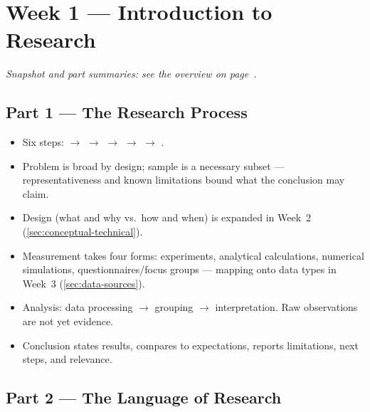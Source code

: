 \documentclass[../main.tex]{subfiles}
\begin{document}
\setlength{\parskip}{3pt}

\chapter{Week 1 — Introduction to Research}
\label{ch:week1}

\textit{Snapshot and part summaries: see the overview on page~\pageref{ov:week1}.}

\section{Part 1 — The Research Process}
\label{sec:research-process}

\begin{itemize}
  \item Six steps:  $\to$  $\to$  $\to$  $\to$  $\to$ .
  \item Problem is broad by design; sample is a necessary subset — representativeness and known limitations bound what the conclusion may claim.
  \item Design (what and why vs.\ how and when) is expanded in Week~2 (\autoref{sec:conceptual-technical}).
  \item Measurement takes four forms: experiments, analytical calculations, numerical simulations, questionnaires/focus groups — mapping onto data types in Week~3 (\autoref{sec:data-sources}).
  \item Analysis: data processing $\to$ grouping $\to$ interpretation. Raw observations are not yet evidence.
  \item Conclusion states results, compares to expectations, reports limitations, next steps, and relevance.
\end{itemize}

\section{Part 2 — The Language of Research}
\label{sec:language-research}
\end{document}
